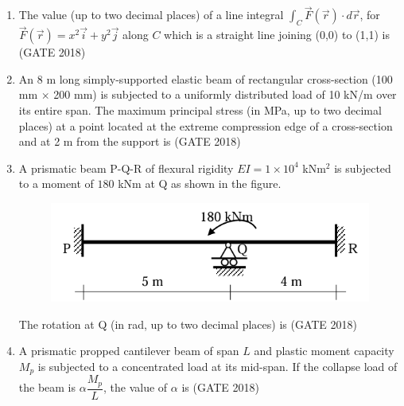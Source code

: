 \documentclass[journal,12pt,onecolumn]{IEEEtran}
\theoremstyle{remark}
\begin{document}
\begin{enumerate}
\item The value (up to two decimal places) of a line integral $\int_C \vec{F}(\vec{r})\cdot d\vec{r}$, for $\vec{F}(\vec{r}) = x^2\vec{i} + y^2\vec{j}$ along $C$ which is a straight line joining (0,0) to (1,1) is \underline{\hspace{3cm}}
\hfill{(GATE 2018)}
\vspace{1cm}

\item An 8 m long simply-supported elastic beam of rectangular cross-section (100 mm $\times$ 200 mm) is subjected to a uniformly distributed load of 10 kN/m over its entire span. The maximum principal stress (in MPa, up to two decimal places) at a point located at the extreme compression edge of a cross-section and at 2 m from the support is \underline{\hspace{3cm}}
\hfill{(GATE 2018)}
\vspace{1cm}

\item A prismatic beam P-Q-R of flexural rigidity $EI = 1 \times 10^4$ kNm$^2$ is subjected to a moment of $180$ kNm at Q as shown in the figure.
\begin{figure}[h]
    \centering
    \includegraphics[width=0.5\linewidth]{GATE-CE-2018/39-2.png}
    \caption{}
    \label{39-2}
\end{figure}
The rotation at Q (in rad, up to two decimal places) is \underline{\hspace{3cm}}
\hfill{(GATE 2018)}
\vspace{1cm}

\item A prismatic propped cantilever beam of span $L$ and plastic moment capacity $M_p$ is subjected to a concentrated load at its mid-span. If the collapse load of the beam is $\alpha \dfrac{M_p}{L}$, the value of $\alpha$ is \underline{\hspace{3cm}}
\hfill{(GATE 2018)}
\vspace{1cm}


\end{enumerate}
\end{document}
